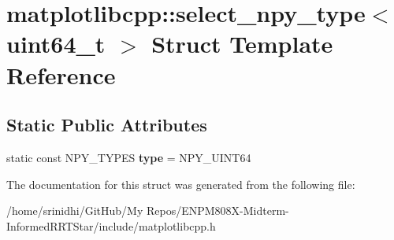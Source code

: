\hypertarget{structmatplotlibcpp_1_1select__npy__type_3_01uint64__t_01_4}{}\section{matplotlibcpp\+:\+:select\+\_\+npy\+\_\+type$<$ uint64\+\_\+t $>$ Struct Template Reference}
\label{structmatplotlibcpp_1_1select__npy__type_3_01uint64__t_01_4}
\subsection*{Static Public Attributes}
\begin{DoxyCompactItemize}
\item 
static const N\+P\+Y\+\_\+\+T\+Y\+P\+ES {\bfseries type} = N\+P\+Y\+\_\+\+U\+I\+N\+T64\hypertarget{structmatplotlibcpp_1_1select__npy__type_3_01uint64__t_01_4_a8d5871452f90ff04452f0416bee54fca}{}\label{structmatplotlibcpp_1_1select__npy__type_3_01uint64__t_01_4_a8d5871452f90ff04452f0416bee54fca}

\end{DoxyCompactItemize}


The documentation for this struct was generated from the following file\+:\begin{DoxyCompactItemize}
\item 
/home/srinidhi/\+Git\+Hub/\+My Repos/\+E\+N\+P\+M808\+X-\/\+Midterm-\/\+Informed\+R\+R\+T\+Star/include/matplotlibcpp.\+h\end{DoxyCompactItemize}
